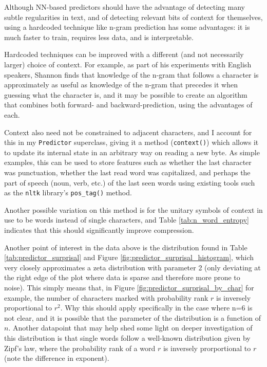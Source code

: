 Although NN-based predictors should have the advantage of detecting many subtle regularities in text, and of detecting relevant bits of context for themselves, using a hardcoded technique like n-gram prediction has some advantages: it is much faster to train, requires less data, and is interpretable.

Hardcoded techniques can be improved with a different (and not necessarily larger) choice of context. For example, as part of his experiments with English speakers, Shannon finds that knowledge of the n-gram that follows a character is approximately as useful as knowledge of the n-gram that precedes it when guessing what the character is, and it may be possible to create an algorithm that combines both forward- and backward-prediction, using the advantages of each.

Context also need not be constrained to adjacent characters, and I account for this in my \texttt{Predictor} superclass, giving it a method (\texttt{context()}) which allows it to update its internal state in an arbitrary way on reading a new byte. As simple examples, this can be used to store features such as whether the last character was punctuation, whether the last read word was capitalized, and perhaps the part of speech (noun, verb, etc.) of the last seen words using existing tools such as the \texttt{nltk} library's \texttt{pos\_tag()} method.

Another possible variation on this method is for the unitary symbols of context in use to be words instead of single characters, and Table \ref{tab:n_word_entropy} indicates that this should significantly improve compression.

Another point of interest in the data above is the distribution found in Table \ref{tab:predictor_surprisal} and Figure \ref{fig:predictor_surprisal_histogram}, which very closely approximates a zeta distribution with parameter 2 (only deviating at the right edge of the plot where data is sparse and therefore more prone to noise). This simply means that, in Figure \ref{fig:predictor_surprisal_by_char} for example, the number of characters marked with probability rank $r$ is inversely proportional to $r^2$. Why this should apply specifically in the case where n=6 is not clear, and it is possible that the parameter of the distribution is a function of $n$. Another datapoint that may help shed some light on deeper investigation of this distribution is that single words follow a well-known distribution given by Zipf's law, where the probability rank of a word $r$ is inversely prorportional to $r$ (note the difference in exponent).

